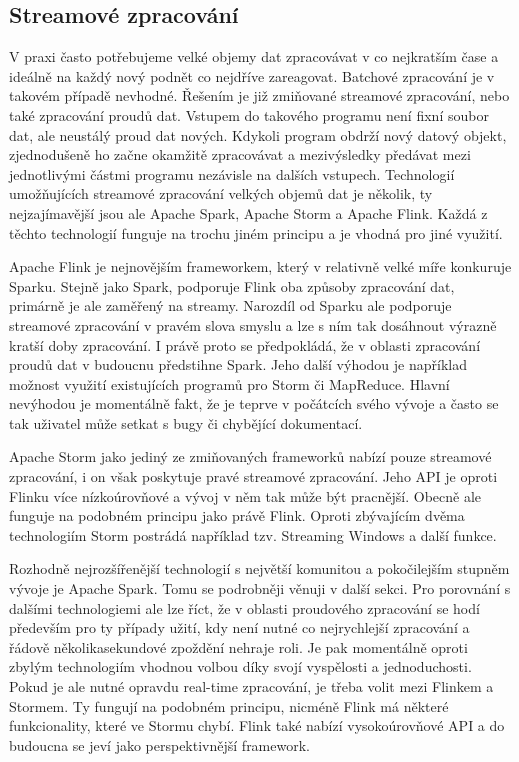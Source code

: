 \documentclass[thesis=B,czech]{FITthesis}[2012/06/26]
\begin{document}
\subsection{Streamové zpracování}
	V praxi často potřebujeme velké objemy dat zpracovávat v co nejkratším čase a ideálně na každý nový podnět co nejdříve zareagovat. Batchové zpracování je v takovém případě nevhodné. Řešením je již zmiňované streamové zpracování, nebo také zpracování proudů dat. Vstupem do takového programu není fixní soubor dat, ale neustálý proud dat nových. Kdykoli program obdrží nový datový objekt, zjednodušeně ho začne okamžitě zpracovávat a mezivýsledky předávat mezi jednotlivými částmi programu nezávisle na dalších vstupech. Technologií umožňujících streamové zpracování velkých objemů dat je několik, ty nejzajímavější jsou ale Apache Spark, Apache Storm a Apache Flink. Každá z těchto technologií funguje na trochu jiném principu a je vhodná pro jiné využití. 
	
	Apache Flink je nejnovějším frameworkem, který v relativně velké míře konkuruje Sparku. Stejně jako Spark, podporuje Flink oba způsoby zpracování dat, primárně je ale zaměřený na streamy. Narozdíl od Sparku ale podporuje streamové zpracování v pravém slova smyslu a lze s ním tak dosáhnout výrazně kratší doby zpracování\cite{streaming-benchmark}. I právě proto se předpokládá, že v oblasti zpracování proudů dat v budoucnu předstihne Spark\cite{flink-future}. Jeho další výhodou je například možnost využití existujících programů pro Storm či MapReduce. Hlavní nevýhodou je momentálně fakt, že je teprve v počátcích svého vývoje a často se tak uživatel může setkat s bugy či chybějící dokumentací. 
	
	Apache Storm jako jediný ze zmiňovaných frameworků nabízí pouze streamové zpracování, i on však poskytuje pravé streamové zpracování. Jeho API je oproti Flinku více nízkoúrovňové a vývoj v něm tak může být pracnější. Obecně ale funguje na podobném principu jako právě Flink. Oproti zbývajícím dvěma technologiím Storm postrádá například tzv. Streaming Windows a další funkce\cite{so-flink-storm}.
	
	Rozhodně nejrozšířenější technologií s největší komunitou a pokočilejším stupněm vývoje je Apache Spark. Tomu se podrobněji věnuji v další sekci. Pro porovnání s dalšími technologiemi ale lze říct, že v oblasti proudového zpracování se hodí především pro ty případy užití, kdy není nutné co nejrychlejší zpracování a řádově několikasekundové zpoždění nehraje roli. Je pak momentálně oproti zbylým technologiím vhodnou volbou díky svojí vyspělosti a jednoduchosti. Pokud je ale nutné opravdu real-time zpracování, je třeba volit mezi Flinkem a Stormem. Ty fungují na podobném principu, nicméně Flink má některé funkcionality, které ve Stormu chybí\cite{so-flink-storm}. Flink také nabízí vysokoúrovňové API a do budoucna se jeví jako perspektivnější framework. 
	
\end{document}
